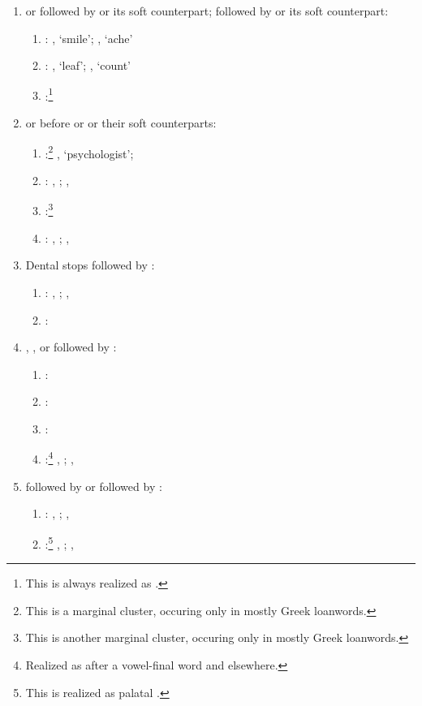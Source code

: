 \begin{enumerate}
\begin{enumerate}
		\end{enumerate}
	\item {} or  followed by  or its soft counterpart;  followed by  or its soft counterpart:
		\begin{enumerate}
			\item {}:  , `smile';  , `ache'
			\item {}:  , `leaf';  , `count'
			\item {}:\footnote{This is always realized as .} 
		\end{enumerate}
	\item {} or  before  or  or their soft counterparts:
	\begin{enumerate}
		\item {}:\footnote{This is a marginal cluster, occuring only in mostly Greek loanwords.}  , `psychologist';
		\item {}:  , ;  , 
		\item {}:\footnote{This is another marginal cluster, occuring only in mostly Greek loanwords.} 
		\item {}:  , ;  , 
	\end{enumerate}
	\item Dental stops followed by :
	\begin{enumerate}
		\item {}:  , ;  , 
		\item {}:
	\end{enumerate}
		\item {}, ,  or   followed by :
	\begin{enumerate}
		\item {}:
		\item {}:
		\item {}:
		\item {}:\footnote{Realized as  after a vowel-final word and  elsewhere.}  , ;  , 
	\end{enumerate}

		\item {} followed by \bt{n} or  followed by :
	\begin{enumerate}
		\item {}:  , ;  , 
		\item {}:\footnote{This is realized as palatal .}  , ;  , 
	\end{enumerate}


\end{enumerate}
